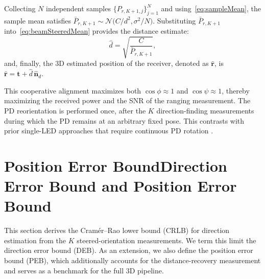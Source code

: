 \documentclass[journal]{IEEEtran}
\newcommand{\added}[1]{{\color{blue}#1}}
\newcommand{\deleted}[1]{{\color{red}#1}}
\begin{document}
Collecting \(N\) independent samples \(\{P_{r,K+1,j}\}_{j=1}^{N}\) and
using~\eqref{eq:sampleMean}, the sample mean satisfies
\(\bar P_{r,K+1}\sim\mathcal{N}\bigl(C/d^{2},\sigma^{2}/N\bigr)\).
Substituting \(\bar P_{r,K+1}\) into~\eqref{eq:beamSteeredMean} provides the distance estimate:
\begin{equation}
\hat d = \sqrt{\frac{C}{\bar P_{r,K+1}}},
\label{eq:dhat}
\end{equation}
and, finally, the 3D estimated position of the receiver, denoted as \(\hat{\mathbf{r}}\), is
$\hat{\mathbf{r}} = \mathbf{t} + \hat d \,\hat{\mathbf{n}}_{d}$.

\added{ This cooperative alignment maximizes both $\cos\phi\approx 1$ and $\cos\psi\approx 1$, thereby maximizing the received power and the SNR of the ranging measurement.
The PD reorientation is performed once, after the $K$ direction-finding measurements during which the PD remains at an arbitrary fixed pose. This contrasts with prior single-LED approaches that require continuous PD rotation \cite{Liu2022,Wang2024,Shi2025}.}

\section{\deleted{Position Error Bound}\added{Direction Error Bound and Position Error Bound}}
\label{sec:PEB}

\added{This section derives the Cramér--Rao lower bound (CRLB) for direction estimation from the $K$ steered-orientation measurements. We term this limit the direction error bound (DEB). As an extension, we also define the position error bound (PEB), which additionally accounts for the distance-recovery measurement and serves as a benchmark for the full 3D pipeline.}
\end{document}
